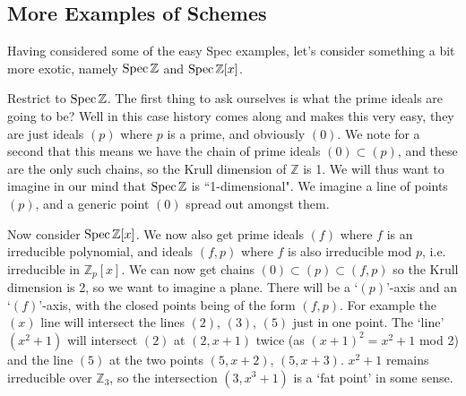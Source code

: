 \documentclass[000-main.tex]{subfiles}
\begin{document}
\subsection{More Examples of Schemes}%
\label{sec:scheme-examples}


\begin{example}
	Having considered some of the easy Spec examples, let's consider something a bit more exotic, namely $\operatorname{Spec} \mathbb{Z}$ and $\operatorname{Spec} \mathbb{Z}[x]$.


	Restrict to $\operatorname{Spec} \mathbb{Z}$. The first thing to ask ourselves is what the prime ideals are going to be? Well in this case history comes along and makes this very easy, they are just ideals $(p)$ where $p$ is a prime, and obviously $(0)$. We note for a second that this means we have the chain of prime ideals $(0) \subset (p)$, and these are the only such chains, so the Krull dimension of $\mathbb{Z}$ is 1. We will thus want to imagine in our mind that $\operatorname{Spec} \mathbb{Z}$ is ``1-dimensional". We imagine a line of points $(p)$, and a generic point $(0)$ spread out amongst them.

	Now consider $\operatorname{Spec} \mathbb{Z}[x]$. We now also get prime ideals $(f)$ where $f$ is an irreducible polynomial, and ideals $(f, p)$ where $f$ is also irreducible mod $p$, i.e. irreducible in $\mathbb{Z}_p[x]$. We can now get chains $(0) \subset (p) \subset (f, p)$ so the Krull dimension is 2, so we want to imagine a plane. There will be a `$(p)$'-axis and an `$(f)$'-axis, with the closed points being of the form $(f, p)$. For example the $(x)$ line will intersect the lines $(2)$, $(3)$, $(5)$ just in one  point. The `line' $(x^2+1)$ will intersect $(2)$ at $(2, x+1)$ twice (as $(x+1)^2 = x^2 + 1$ mod 2) and the line $(5)$ at the two points $(5, x+2)$, $(5, x+3)$. $x^2+1$ remains irreducible over $\mathbb{Z}_3$, so the intersection $(3, x^3+1)$ is a `fat point' in some sense.
\end{example}
\end{document}
